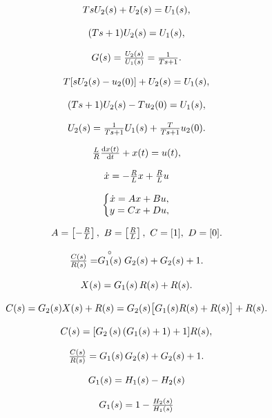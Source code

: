 \documentclass{article}
\begin{document}
\[
$$
T s U_{2} ( s )+U_{2} ( s )=U_{1} ( s ),
$$
\]

\[
$$
( T s+1 ) U_{2} ( s )=U_{1} ( s ),
$$
\]

\[
$$
G ( s )=\frac{U_{2} ( s )} {U_{1} ( s )}=\frac{1} {T s+1}.
$$
\]

\[
$$
T [ s U_{2} ( s )-u_{2} ( 0 ) ]+U_{2} ( s )=U_{1} ( s ),
$$
\]

\[
$$
( T s+1 ) U_{2} ( s )-T u_{2} ( 0 )=U_{1} ( s ),
$$
\]

\[
$$
U_{2} ( s )=\frac{1} {T s+1} U_{1} ( s )+\frac{T} {T s+1} u_{2} ( 0 ).
$$
\]

\[
$$
{\frac{L} {R}} {\frac{\mathrm{d} x ( t )} {\mathrm{d} t}}+x ( t )=u ( t ),
$$
\]

\[
$$
\dot{x}=-\frac{R} {L} x+\frac{R} {L} u
$$
\]

\[
$$
\left\{\begin{matrix} \dot{x}=A x+B u, \\ y=C x+D u, \end{matrix} \right.
$$
\]

\[
$$
A=\left[-\frac{R} {L} \right], \ B=\left[ \frac{R} {L} \right], \ C=[ 1 ], \ D=[ 0 ].
$$
\]

\[
$$
\frac{C ( s )} {R ( s )}=\stackrel{\circ} {G_{1} ( s )} G_{2} ( s )+G_{2} ( s )+1.
$$
\]

\[
$$
X ( s )=G_{1} ( s ) \, R ( s )+R ( s ).
$$
\]

\[
$$
C ( s )=G_{2} ( s ) X ( s )+R ( s )=G_{2} ( s ) {\big[} G_{1} ( s ) R ( s )+R ( s ) {\big]}+R ( s ).
$$
\]

\[
$$
C ( s )=[ G_{2} \left( s \right) ( G_{1} ( s )+1 )+1 ] R ( s ),
$$
\]

\[
$$
\frac{C ( s )} {R ( s )}=G_{1} ( s ) \, G_{2} ( s )+G_{2} ( s )+1.
$$
\]

\[
$$
G_{1} ( s )=H_{1} ( s )-H_{2} ( s )
$$
\]

\[
$$
G_{1} ( s )=1-\frac{H_{2} ( s )} {H_{1} ( s )}
$$
\]
\end{document}
